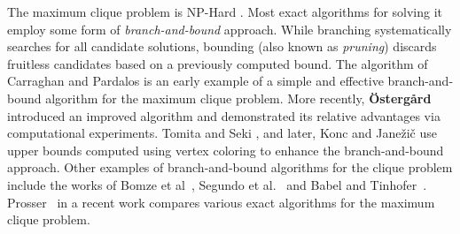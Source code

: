 The maximum clique problem is NP-Hard \cite{Garey:1979:CIG:578533}.
Most exact algorithms for solving it employ some form of {\it branch-and-bound} approach. 
While branching systematically searches for all candidate solutions, bounding (also known as {\em pruning}) discards fruitless candidates based on a previously computed bound. 
The algorithm of Carraghan and Pardalos \cite{pardalos} is an early example of 
a simple and  effective branch-and-bound algorithm for the maximum clique problem.
More recently, {\bf \"{O}sterg{\aa}rd} \cite{ostergard} introduced 
an improved algorithm and demonstrated its relative advantages via computational experiments. 
Tomita and Seki \cite{citeulike:7905505}, and later, Konc and Jane\v{z}i\v{c} \cite{konc2007improved}
use upper bounds computed using vertex coloring to enhance the branch-and-bound approach. 
Other examples of branch-and-bound algorithms for the clique problem include 
the works of Bomze et al~\cite{Bomze99themaximum}, Segundo et al.~\cite{SanSegundo}
and Babel and Tinhofer~\cite{babel1990branch}.
Prosser~\cite{prosser2012} in a recent work compares various exact algorithms 
for the maximum clique problem. %


